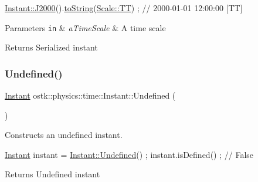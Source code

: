 \begin{DoxyCode}
\hyperlink{classostk_1_1physics_1_1time_1_1_instant_a3f84d0c2d0b140326d3b172b54e3ffff}{Instant::J2000}().\hyperlink{classostk_1_1physics_1_1time_1_1_instant_a710ff6dec3b97f4e10bcfeae6335eb56}{toString}(\hyperlink{namespaceostk_1_1physics_1_1time_adf23d37bd8641fb76a0e98ab46a70df7adf1f3edb9115acb0a1e04209b7a9937b}{Scale::TT}) ; \textcolor{comment}{// 2000-01-01 12:00:00 [TT]}
\end{DoxyCode}



\begin{DoxyParams}[1]{Parameters}
\mbox{\tt in}  & {\em a\+Time\+Scale} & A time scale \\
\hline
\end{DoxyParams}
\begin{DoxyReturn}{Returns}
Serialized instant 
\end{DoxyReturn}
\mbox{\label{classostk_1_1physics_1_1time_1_1_instant_a0c95c97e9aa17863aecf8c9ebc821c0b}} 
\subsubsection{\texorpdfstring{Undefined()}{Undefined()}}
{\footnotesize\ttfamily \hyperlink{classostk_1_1physics_1_1time_1_1_instant}{Instant} ostk\+::physics\+::time\+::\+Instant\+::\+Undefined (\begin{DoxyParamCaption}{ }\end{DoxyParamCaption})\hspace{0.3cm}{\ttfamily [static]}}



Constructs an undefined instant. 


\begin{DoxyCode}
\hyperlink{classostk_1_1physics_1_1time_1_1_instant_a132c1e4b2fe9a9a671109206e297bd5d}{Instant} instant = \hyperlink{classostk_1_1physics_1_1time_1_1_instant_a0c95c97e9aa17863aecf8c9ebc821c0b}{Instant::Undefined}() ;
instant.isDefined() ; \textcolor{comment}{// False}
\end{DoxyCode}


\begin{DoxyReturn}{Returns}
Undefined instant 
\end{DoxyReturn}


